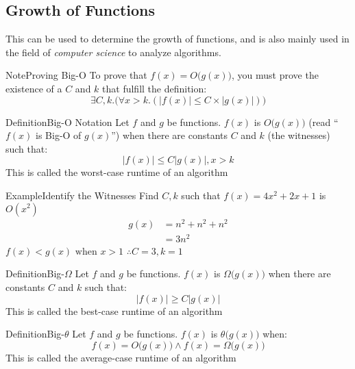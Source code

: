 \documentclass{MathNotes}
\newenvironment{example}[1]{\begin{BlueBox}{Example}{#1}}{\end{BlueBox}}
\newenvironment{definition}[1]{\begin{RedBox}{Definition}{#1}}{\end{RedBox}}
\newenvironment{note}[1]{\begin{YellowBox}{Note}{#1}}{\end{YellowBox}}
\begin{document}
\newpage
\subsection{Growth of Functions}
This can be used to determine the growth of functions, and is also mainly
used in the field of \textit{computer science} to analyze algorithms.

\begin{multicols}{2}
	\begin{note}{Proving Big-O}\label{note:proving-big-o}
		To prove that $f(x)=O\big(g(x)\big)$, you must prove the existence of a $C$ and $k$ that fulfill the definition:\[\exists C,k.\big(\forall x>k.(|f(x)|\leq C\times |g(x)|)\big)\]
	\end{note}
	\begin{definition}{Big-O Notation}\label{def:big-o-notation}
		Let $f$ and $g$ be functions. $f(x)$ is $O\big(g(x)\big)$ (read ``$f(x)$ is Big-O of $g(x)$'') when there are constants $C$ and $k$ (the witnesses) such that:\[|f(x)|\leq C|g(x)|,x>k\] This is called the worst-case runtime of an algorithm
	\end{definition}
\end{multicols}

\begin{example}{Identify the Witnesses}\label{ex:find-witnesses}
	Find $C,k$ such that $f(x)=4x^2+2x+1$ is $O(x^2)$
	\begin{align*}
		g(x) & = n^2+n^2+n^2 \\
		     & = 3n^2
	\end{align*}
	$f(x)<g(x) \text{ when } x>1$
	\centering $\displaystyle\therefore C=3,k=1$
\end{example}

\begin{multicols}{2}
	\begin{definition}{Big-$\Omega$}\label{def:big-omega}
		Let $f$ and $g$ be functions. $f(x)$ is $\Omega\big(g(x)\big)$ when there are
		constants $C$ and $k$ such that:\[|f(x)|\geq C|g(x)|\] This is called the
		best-case runtime of an algorithm
	\end{definition}
	\begin{definition}{Big-$\theta$}\label{def:big-theta}
		Let $f$ and $g$ be functions. $f(x)$ is $\theta\big(g(x)\big)$ when:\[f(x)=O\big(g(x)\big)\land f(x)=\Omega\big(g(x)\big)\]
		This is called the average-case runtime of an algorithm
	\end{definition}
\end{multicols}
\end{document}
